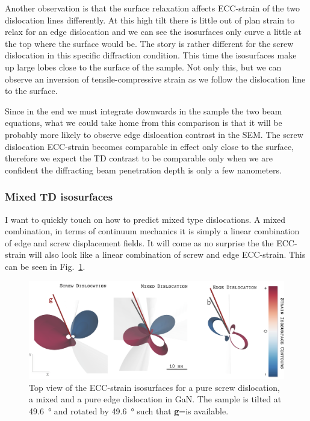 Another observation is that the surface relaxation affects ECC-strain of the two dislocation lines differently. At this high tilt there is little out of plan strain to relax for an edge dislocation and we can see the isosurfaces only curve a little at the top where the surface would be. The story is rather different for the screw dislocation in this specific diffraction condition. This time the isosurfaces make up large lobes close to the surface of the sample. Not only this, but we can observe an inversion of tensile-compressive strain as we follow the dislocation line to the surface. 

Since in the end we must integrate downwards in the sample the two beam equations, what we could take home from this comparison is that it will be probably more likely to observe edge dislocation contrast in the SEM. The screw dislocation ECC-strain becomes comparable in effect only close to the surface, therefore we expect the TD contrast to be comparable only when we are confident the diffracting beam penetration depth is only a few nanometers. 

\subsubsection{Mixed TD isosurfaces}

I want to quickly touch on how to predict mixed type dislocations. A mixed combination, in terms of continuum mechanics it is simply a linear combination of edge and screw displacement fields. It will come as no surprise the the ECC-strain will also look like a linear combination  of screw  and edge ECC-strain. This can be seen in Fig.~\ref{fig:mixed}.



\begin{figure}[ht]
    \centering
    \includegraphics[width=1\linewidth]{Figures/GaNTDtop.png}
    \caption[Mixed TD ECC-strain.]{Top view of the ECC-strain isosurfaces for a pure screw dislocation, a mixed and a pure edge dislocation in GaN. The sample is tilted at \SI{49.6}{\degree} and rotated by \SI{49.6}{\degree} such that \textbf{g}=\hkl[75-3] is available.}
    \label{fig:mixed}
\end{figure}


